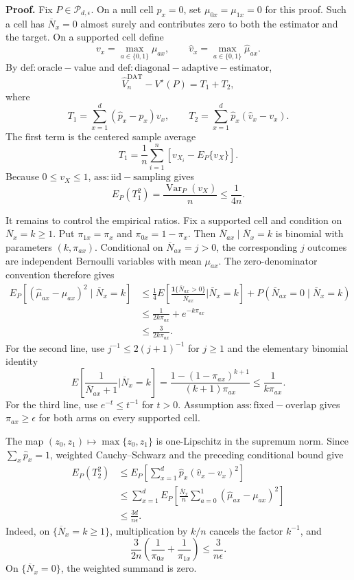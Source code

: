 \textbf{Proof.}
Fix \(P\in\mathcal P_{d,\epsilon}\).  On a null cell \(p_x=0\), set \(\mu_{0x}=\mu_{1x}=0\) for this proof.  Such a cell has \(\overline N_x=0\) almost surely and contributes zero to both the estimator and the target.  On a supported cell define
\[
 v_x=\max_{a\in\{0,1\}}\mu_{ax},
 \qquad
 \widehat v_x=\max_{a\in\{0,1\}}\widehat\mu_{ax}.
\]
By \(\mathrm{def:oracle-value}\) and \(\mathrm{def:diagonal-adaptive-estimator}\),
\[
 \widehat V_n^{\mathrm{DAT}}-V^\star(P)=T_1+T_2,
\]
where
\[
 T_1=\sum_{x=1}^d(\widehat p_x-p_x)v_x,
 \qquad
 T_2=\sum_{x=1}^d\widehat p_x(\widehat v_x-v_x).
\]
The first term is the centered sample average
\[
 T_1=\frac1n\sum_{i=1}^n
 \left[v_{X_i}-E_P\{v_X\}\right].
\]
Because \(0\le v_X\le1\), \(\mathrm{ass:iid-sampling}\) gives
\[
 E_P(T_1^2)=\frac{\operatorname{Var}_P(v_X)}n\le\frac1{4n}.
\]

It remains to control the empirical ratios.  Fix a supported cell and condition on \(\overline N_x=k\ge1\).  Put \(\pi_{1x}=\pi_x\) and \(\pi_{0x}=1-\pi_x\).  Then \(\overline N_{ax}\mid\overline N_x=k\) is binomial with parameters \((k,\pi_{ax})\).  Conditional on \(\overline N_{ax}=j>0\), the corresponding \(j\) outcomes are independent Bernoulli variables with mean \(\mu_{ax}\).  The zero-denominator convention therefore gives
\[
 \begin{aligned}
 E_P\!\left[
   (\widehat\mu_{ax}-\mu_{ax})^2
   \mid \overline N_x=k
 \right]
 &\le \frac14 E\!\left[
    \frac{\mathbf 1\{\overline N_{ax}>0\}}{\overline N_{ax}}
    \mathrel{\Big|}\overline N_x=k
  \right]
  +P(\overline N_{ax}=0\mid\overline N_x=k)\\
 &\le \frac1{2k\pi_{ax}}+e^{-k\pi_{ax}}\\
 &\le \frac3{2k\pi_{ax}}.
 \end{aligned}
\]
For the second line, use \(j^{-1}\le2(j+1)^{-1}\) for \(j\ge1\) and the elementary binomial identity
\[
 E\!\left[
   \frac1{\overline N_{ax}+1}
   \mathrel{\Big|}\overline N_x=k
 \right]
 =\frac{1-(1-\pi_{ax})^{k+1}}{(k+1)\pi_{ax}}
 \le\frac1{k\pi_{ax}}.
\]
For the third line, use \(e^{-t}\le t^{-1}\) for \(t>0\).  Assumption \(\mathrm{ass:fixed-overlap}\) gives \(\pi_{ax}\ge\epsilon\) for both arms on every supported cell.

The map \((z_0,z_1)\mapsto\max\{z_0,z_1\}\) is one-Lipschitz in the supremum norm.  Since \(\sum_x\widehat p_x=1\), weighted Cauchy--Schwarz and the preceding conditional bound give
\[
 \begin{aligned}
 E_P(T_2^2)
 &\le E_P\!\left[
   \sum_{x=1}^d\widehat p_x(\widehat v_x-v_x)^2
 \right]\\
 &\le \sum_{x=1}^d E_P\!\left[
   \frac{\overline N_x}{n}
   \sum_{a=0}^1(\widehat\mu_{ax}-\mu_{ax})^2
 \right]\\
 &\le \frac{3d}{n\epsilon}.
 \end{aligned}
\]
Indeed, on \(\{\overline N_x=k\ge1\}\), multiplication by \(k/n\) cancels the factor \(k^{-1}\), and
\[
 \frac3{2n}\left(\frac1{\pi_{0x}}+\frac1{\pi_{1x}}\right)
 \le\frac3{n\epsilon}.
\]
On \(\{\overline N_x=0\}\), the weighted summand is zero.

